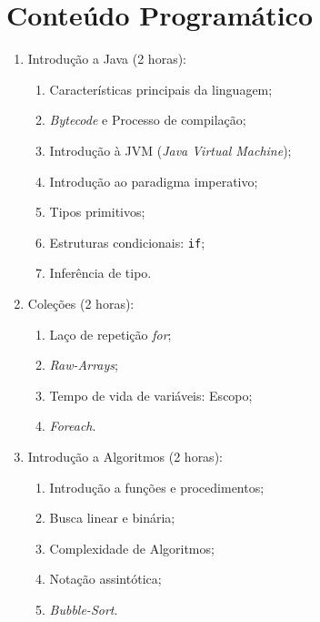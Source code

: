 \documentclass{article}
\begin{document}
\section{Conteúdo Programático}

\begin{enumerate}
    \item Introdução a Java (2 horas):
        \begin{samepage}
        \begin{enumerate}
                \item Características principais da linguagem;
                \item \textit{Bytecode} e Processo de compilação;
                \item Introdução à JVM (\textit{Java Virtual Machine});
                \item Introdução ao paradigma imperativo;
                \item Tipos primitivos;
                \item Estruturas condicionais: \texttt{if};
                \item Inferência de tipo.
        \end{enumerate}
        \end{samepage}
    \item Coleções (2 horas):
        \begin{samepage}
        \begin{enumerate}
                \item Laço de repetição \textit{for};
                \item \textit{Raw-Arrays};
                \item Tempo de vida de variáveis: Escopo;
                \item \textit{Foreach}.
        \end{enumerate}
        \end{samepage}
    \item Introdução a Algoritmos (2 horas):
        \begin{samepage}
        \begin{enumerate}
                \item Introdução a funções e procedimentos;
                \item Busca linear e binária;
                \item Complexidade de Algoritmos;
                \item Notação assintótica;
                \item \textit{Bubble-Sort}.

\end{enumerate}
\end{samepage}
\end{enumerate}
\end{document}
